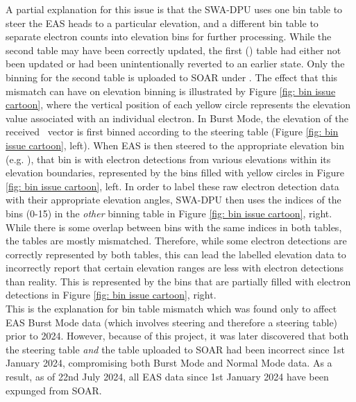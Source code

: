 A partial explanation for this issue is that the SWA-DPU uses one bin table to steer the EAS heads to a particular elevation, and a different bin table to separate electron counts into elevation bins for further processing. While the second table may have been correctly updated, the first () table had either not been updated or had been unintentionally reverted to an earlier state. Only the binning for the second table is uploaded to SOAR under . The effect that this mismatch can have on elevation binning is illustrated by Figure \ref{fig: bin issue cartoon}, where the vertical position of each yellow circle represents the elevation value associated with an individual electron. In Burst Mode, the elevation of the received \Bmag\ vector is first binned according to the steering table (Figure \ref{fig: bin issue cartoon}, left). When EAS is then steered to the appropriate elevation bin (e.g. ), that bin is  with electron detections from various elevations within its elevation boundaries, represented by the bins filled with yellow circles in Figure \ref{fig: bin issue cartoon}, left. In order to label these raw electron detection data with their appropriate elevation angles, SWA-DPU then uses the indices of the  bins (0-15) in the \textit{other} binning table in Figure \ref{fig: bin issue cartoon}, right. While there is some overlap between bins with the same indices in both tables, the tables are mostly mismatched. Therefore, while some electron detections are correctly represented by both tables, this can lead the labelled elevation data to incorrectly report that certain elevation ranges are less  with electron detections than reality. This is represented by the bins that are partially filled with electron detections in Figure \ref{fig: bin issue cartoon}, right. 
\\

This is the explanation for bin table mismatch which was found only to affect EAS Burst Mode data (which involves steering and therefore a steering table) prior to 2024. However, because of this project, it was later discovered that both the steering table \textit{and} the table uploaded to SOAR had been incorrect since 1st January 2024, compromising both Burst Mode and Normal Mode data. As a result, as of 22nd July 2024, all EAS data since 1st January 2024 have been expunged from SOAR\cite{soar}.

